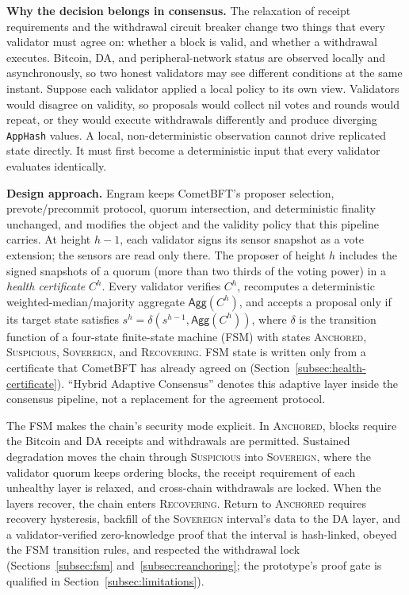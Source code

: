 \textbf{Why the decision belongs in consensus.} The relaxation of receipt
requirements and the withdrawal circuit breaker change two things that every
validator must agree on: whether a block is valid, and whether a withdrawal
executes. Bitcoin, DA, and peripheral-network status are observed locally and
asynchronously, so two honest validators may see different conditions at the
same instant. Suppose each validator applied a local policy to its own view.
Validators would disagree on validity, so proposals would collect nil votes and
rounds would repeat, or they would execute withdrawals differently and produce
diverging \texttt{AppHash} values. A local, non-deterministic observation
cannot drive replicated state directly. It must first become a deterministic
input that every validator evaluates identically.

\textbf{Design approach.} Engram keeps CometBFT's proposer selection,
prevote/precommit protocol, quorum intersection, and deterministic finality
unchanged, and modifies the object and the validity policy that this pipeline
carries. At height $h{-}1$, each validator signs its sensor snapshot as a vote
extension; the sensors are read only there. The proposer of height $h$ includes
the signed snapshots of a quorum (more than two thirds of the voting power) in a \emph{health
certificate} $C^{h}$. Every validator verifies $C^{h}$, recomputes a
deterministic weighted-median/majority aggregate $\mathsf{Agg}(C^{h})$, and
accepts a proposal only if its target state satisfies
$s^{h} = \delta(s^{h-1}, \mathsf{Agg}(C^{h}))$, where $\delta$ is the
transition function of a four-state finite-state machine (FSM) with states
\textsc{Anchored}, \textsc{Suspicious}, \textsc{Sovereign}, and
\textsc{Recovering}. FSM state is written only from a certificate that
CometBFT has already agreed on (Section~\ref{subsec:health-certificate}).
``Hybrid Adaptive Consensus'' denotes this adaptive layer inside the
consensus pipeline, not a replacement for the agreement protocol.

The FSM makes the chain's security mode explicit. In \textsc{Anchored}, blocks
require the Bitcoin and DA receipts and withdrawals are permitted. Sustained
degradation moves the chain through \textsc{Suspicious} into
\textsc{Sovereign}, where the validator quorum keeps ordering blocks, the
receipt requirement of each unhealthy layer is relaxed, and cross-chain
withdrawals are locked. When the layers recover, the chain enters
\textsc{Recovering}. Return to \textsc{Anchored} requires recovery hysteresis,
backfill of the \textsc{Sovereign} interval's data to the DA layer, and a
validator-verified zero-knowledge proof that the interval is hash-linked, obeyed
the FSM transition rules, and respected the withdrawal lock
(Sections~\ref{subsec:fsm} and~\ref{subsec:reanchoring}; the prototype's proof
gate is qualified in Section~\ref{subsec:limitations}).

